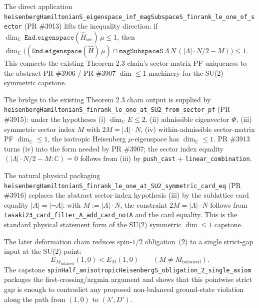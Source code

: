 \documentclass[a4paper,11pt]{article}
\begin{document}
The direct application
\texttt{heisenbergHamiltonianS\_eigenspace\_inf\_magSubspaceS\_finrank\_le\_one\_of\_sector}
(PR \#3913) lifts the inequality direction: if
\(\dim_{\mathbb C}\,\texttt{End.eigenspace}(\hat{H}_{\text{sec}})\,\mu\le1\),
then
\(\dim_{\mathbb C}\bigl((\texttt{End.eigenspace}(\hat{H})\,\mu)\cap
\texttt{magSubspaceS}\,\Lambda\,N\,(|\Lambda|\cdot N/2 - M)\bigr)\le1\).  This
connects the existing Theorem 2.3 chain's sector-matrix PF uniqueness to the
abstract PR \#3906 / PR \#3907 \(\dim\le1\) machinery for the SU(2) symmetric
capstone.

The bridge to the existing Theorem 2.3 chain output is supplied by
\texttt{heisenbergHamiltonianS\_finrank\_le\_one\_at\_SU2\_from\_sector\_pf}
(PR \#3915): under the hypotheses (i) \(\dim_{\mathbb C}E\le2\), (ii)
admissible eigenvector \(\Phi\), (iii) symmetric sector index \(M\) with
\(2M=|\Lambda|\cdot N\), (iv) within-admissible sector-matrix PF
\(\dim_{\mathbb C}\le1\), the isotropic Heisenberg \(\mu\)-eigenspace has
\(\dim_{\mathbb C}\le1\).  PR \#3913 turns (iv) into the form needed by PR
\#3907; the sector index equality
\((|\Lambda|\cdot N/2 - M : \mathbb C)=0\) follows from (iii) by
\texttt{push\_cast} + \texttt{linear\_combination}.

The natural physical packaging
\texttt{heisenbergHamiltonianS\_finrank\_le\_one\_at\_SU2\_symmetric\_card\_eq}
(PR \#3916) replaces the abstract sector-index hypothesis (iii) by the
sublattice card equality \(|A|=|\neg A|\): with \(M:=|A|\cdot N\), the
constraint \(2M=|\Lambda|\cdot N\) follows from
\texttt{tasaki23\_card\_filter\_A\_add\_card\_notA} and the card equality.
This is the standard physical statement form of the SU(2) symmetric
\(\dim\le1\) capstone.

The later deformation chain reduces spin-\(1/2\) obligation~(2) to a single
strict-gap input at the SU(2) point:
\[
  E_{M_{\mathrm{balanced}}}(1,0) < E_M(1,0)
  \qquad (M\ne M_{\mathrm{balanced}}).
\]
The capstone
\texttt{spinHalf\_anisotropicHeisenbergS\_obligation\_2\_single\_axiom}
packages the first-crossing/argmin argument and shows that this pointwise
strict gap is enough to contradict any proposed non-balanced ground-state
violation along the path from \((1,0)\) to \((\lambda',D')\).
\end{document}
